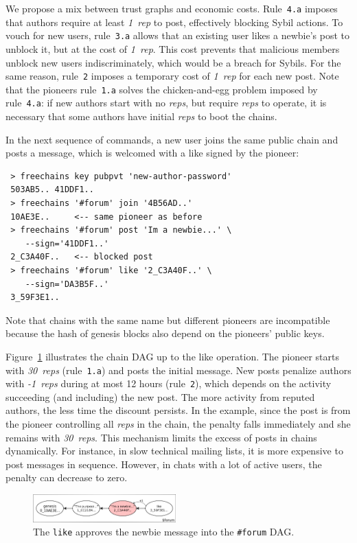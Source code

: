 \documentclass[10pt,journal,compsoc]{IEEEtran}
\newcommand{\reps}     {\emph{reps}\xspace}
\newcommand{\onerep}   {\emph{1~rep}\xspace}
\newcommand{\nreps}[1] {\emph{#1~reps\xspace}}
\newcommand{\code}[1]  {\texttt{\footnotesize{#1}}}
\begin{document}
We propose a mix between trust graphs and economic costs.
%
Rule~\code{4.a} imposes that authors require at least \onerep to post,
effectively blocking Sybil actions.
To vouch for new users, rule~\code{3.a} allows that an existing user likes a
newbie's post to unblock it, but at the cost of \onerep.
This cost prevents that malicious members unblock new users indiscriminately,
which would be a breach for Sybils.
For the same reason, rule~\code{2} imposes a temporary cost of \onerep for
each new post.
%
Note that the pioneers rule~\code{1.a} solves the chicken-and-egg problem
imposed by rule~\code{4.a}: if new authors start with no \reps, but require
\reps to operate, it is necessary that some authors have initial \reps to boot
the chains.

In the next sequence of commands, a new user joins the same public chain and
posts a message, which is welcomed with a like signed by the pioneer:

{\footnotesize
\begin{verbatim}
 > freechains key pubpvt 'new-author-password'
 503AB5.. 41DDF1..
 > freechains '#forum' join '4B56AD..'
 10AE3E..     <-- same pioneer as before
 > freechains '#forum' post 'Im a newbie...' \
    --sign='41DDF1..'
 2_C3A40F..   <-- blocked post
 > freechains '#forum' like '2_C3A40F..' \
    --sign='DA3B5F..'
 3_59F3E1..
\end{verbatim}
}

Note that chains with the same name but different pioneers are incompatible
because the hash of genesis blocks also depend on the pioneers' public keys.

Figure~\ref{fig.forum} illustrates the chain DAG up to the like operation.
The pioneer starts with \nreps{30} (rule~\code{1.a}) and posts the initial
message.
%
New posts penalize authors with \nreps{-1} during at most 12 hours
(rule~\code{2}), which depends on the activity succeeding (and including) the
new post.
The more activity from reputed authors, the less time the discount persists.
In the example, since the post is from the pioneer controlling all \reps in the
chain, the penalty falls immediately and she remains with \nreps{30}.
This mechanism limits the excess of posts in chains dynamically.
For instance, in slow technical mailing lists, it is more expensive to post
messages in sequence.
However, in chats with a lot of active users, the penalty can decrease to zero.

\begin{figure}
\centering
\includegraphics[width=0.49\textwidth]{forum.png}
\caption{
    The \code{like} approves the newbie message into the \code{\#forum} DAG.
}
\label{fig.forum}
\end{figure}
\end{document}
